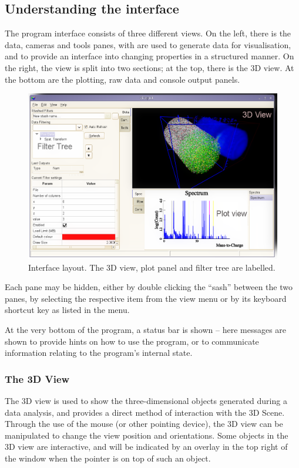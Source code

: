 \documentclass[10pt]{article}
\begin{document}
\subsection{Understanding the interface}
The program interface consists of three different views. On the left, there is the data, cameras and tools panes, with are used to generate data for visualisation, and to provide an interface into changing properties in a structured manner. On the right, the view is split into two sections; at the top, there is the 3D view. At the bottom are the plotting, raw data and console output panels.  

\begin{figure}[ht]
  \centering
 \includegraphics[width=0.85 \textwidth,keepaspectratio=true]{./figures/interface.png}

 \caption{Interface layout. The 3D view, plot panel and filter tree are labelled.}
\label{fig:interfaceLayout}
\end{figure}


Each pane may be hidden, either by double clicking the ``sash'' between the two panes, by selecting the respective item from the view menu or by its keyboard shortcut key as listed in the menu.  

At the very bottom of the program, a status bar is shown -- here messages are shown to provide hints on how to use the program, or to communicate information relating to the program's internal state. 


\FloatBarrier
\subsubsection{The 3D View}

The 3D view is used to show the three-dimensional objects generated during a data analysis, and provides a direct method of interaction with the 3D Scene. Through the use of the mouse (or other pointing device), the 3D view can be manipulated to change the view position and orientations. Some objects in the 3D view are interactive, and will be indicated by an overlay in the top right of the window when the pointer is on top of such an object. 
\end{document}
